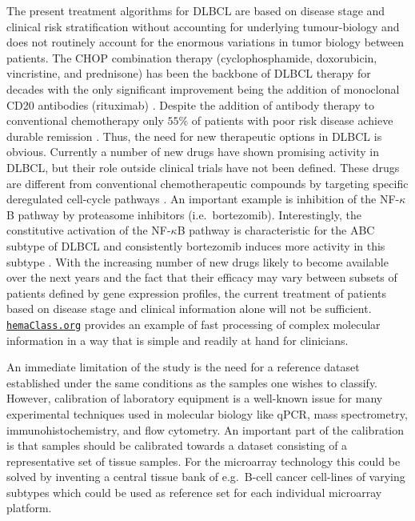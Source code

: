 \documentclass[twocolumn]{bmcart}%
\newcommand{\hemaClass}{\href{http://hemaClass.org}{\texttt{hemaClass.org}}}
\begin{document}
The present treatment algorithms for DLBCL are based on disease stage and clinical risk stratification without accounting for underlying tumour-biology \cite{Schmoll2012} and does not routinely account for the enormous variations in tumor biology between patients.
The CHOP combination therapy (cyclophosphamide, doxorubicin, vincristine, and prednisone) has been the backbone of DLBCL therapy for decades with the only significant improvement being the addition of monoclonal CD20 antibodies (rituximab) \cite{Coiffier2002a}.
Despite the addition of antibody therapy to conventional chemotherapy only $55\%$ of patients with poor risk disease achieve durable remission \cite{Ziepert2010}.
Thus, the need for new therapeutic options in DLBCL is obvious.
Currently a number of new drugs have shown promising activity in DLBCL, but their role outside clinical trials have not been defined.
These drugs are different from conventional chemotherapeutic compounds by targeting specific deregulated cell-cycle pathways \cite{Friedberg2011}.
An important example is inhibition of the NF-$\kappa$B pathway by proteasome inhibitors (i.e.\ bortezomib).
Interestingly, the constitutive activation of the NF-$\kappa$B pathway is characteristic for the ABC subtype of DLBCL and consistently bortezomib induces more activity in this subtype \cite{Nogai2013}.
With the increasing number of new drugs likely to become available over the next years and the fact that their efficacy may vary between subsets of patients defined by gene expression profiles, the current treatment of patients based on disease stage and clinical information alone will not be sufficient.
\hemaClass{} provides an example of fast processing of complex molecular information in a way that is simple and readily at hand for clinicians.

An immediate limitation of the study is the need for a reference dataset established under the same conditions as the samples one wishes to classify.
However, calibration of laboratory equipment is a well-known issue for many experimental techniques used in molecular biology like qPCR, mass spectrometry, immunohistochemistry, and flow cytometry.
An important part of the calibration is that samples should be calibrated towards a dataset consisting of a representative set of tissue samples.
For the microarray technology this could be solved by inventing a central tissue bank of e.g.\ B-cell cancer cell-lines of varying subtypes which could be used as reference set for each individual microarray platform.
\end{document}
